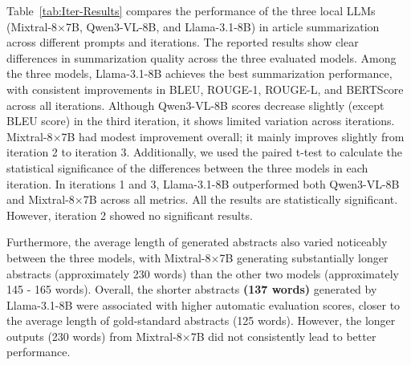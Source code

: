 \documentclass[bdcc,article,submit,pdftex,moreauthors]{Definitions/mdpi}
\begin{document}

Table~\ref{tab:Iter-Results} compares the performance of the three local LLMs (Mixtral-8$\times$7B, Qwen3-VL-8B, and Llama-3.1-8B) in article summarization across different prompts and iterations.
The reported results show clear differences in summarization quality across the three evaluated models.
Among the three models, Llama-3.1-8B achieves the best summarization performance, with consistent improvements in BLEU, ROUGE-1, ROUGE-L, and BERTScore across all iterations.
Although Qwen3-VL-8B scores decrease slightly (except BLEU score) in the third iteration, it shows limited variation across iterations.
Mixtral-8$\times$7B had modest improvement overall; it mainly improves slightly from iteration 2 to iteration 3.
Additionally, we used the paired t-test to calculate the statistical significance of the differences between the three models in each iteration.
In iterations 1 and 3, Llama-3.1-8B outperformed both Qwen3-VL-8B and Mixtral-8$\times$7B across all metrics. All the results are statistically significant. However, iteration 2 showed no significant results. %

Furthermore, the average length of generated abstracts also varied noticeably between the three models, with Mixtral-8$\times$7B generating substantially longer abstracts (approximately 230 words) than the other two models (approximately 145 - 165 words). Overall, the shorter abstracts \textbf{(137 words)} generated by Llama-3.1-8B were associated with higher automatic evaluation scores, closer to the  average length of gold-standard abstracts (125 words). However, the longer outputs (230 words) from Mixtral-8$\times$7B did not consistently lead to better performance.

\end{document}
